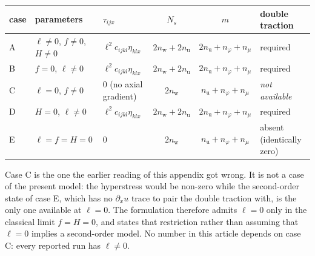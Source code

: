 \begin{center}
\renewcommand{\arraystretch}{1.15}
\begin{tabular}{@{}lllccl@{}}
\toprule
case & parameters & $\tau_{ijx}$ & $N_s$ & $m$ & double traction \\
\midrule
A & $\ell\neq0$, $f\neq0$, $H\neq0$ & $\ell^{2}c_{ijkl}\eta_{klx}$ & $2n_{\mathrm w}+2n_{\mathrm u}$ & $2n_{\mathrm u}+n_\varphi+n_\mu$ & required \\
B & $f=0$, $\ell\neq0$ & $\ell^{2}c_{ijkl}\eta_{klx}$ & $2n_{\mathrm w}+2n_{\mathrm u}$ & $2n_{\mathrm u}+n_\varphi+n_\mu$ & required \\
C & $\ell=0$, $f\neq0$ & $0$ (no axial gradient) & $2n_{\mathrm w}$ & $n_{\mathrm u}+n_\varphi+n_\mu$ & \emph{not available} \\
D & $H=0$, $\ell\neq0$ & $\ell^{2}c_{ijkl}\eta_{klx}$ & $2n_{\mathrm w}+2n_{\mathrm u}$ & $2n_{\mathrm u}+n_\varphi+n_\mu$ & required \\
E & $\ell=f=H=0$ & $0$ & $2n_{\mathrm w}$ & $n_{\mathrm u}+n_\varphi+n_\mu$ & absent (identically zero) \\
\bottomrule
\end{tabular}
\end{center}

\noindent Case C is the one the earlier reading of this appendix got wrong.  It is
not a case of the present model: the hyperstress would be non-zero while the
second-order state of case E, which has no $\partial_x u$ trace to pair the
double traction with, is the only one available at $\ell=0$.  The formulation
therefore admits $\ell=0$ only in the classical limit $f=H=0$, and states that
restriction rather than assuming that $\ell=0$ implies a second-order model.  No
number in this article depends on case C: every reported run has $\ell\neq0$.

